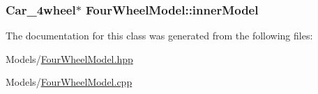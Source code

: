 \subsubsection[{\texorpdfstring{inner\+Model}{innerModel}}]{\setlength{\rightskip}{0pt plus 5cm}Car\+\_\+4wheel$\ast$ Four\+Wheel\+Model\+::inner\+Model\hspace{0.3cm}{\ttfamily [private]}}\hypertarget{classFourWheelModel_aa4e5165e690a959eda31d186f83e615d}{}\label{classFourWheelModel_aa4e5165e690a959eda31d186f83e615d}


The documentation for this class was generated from the following files\+:\begin{DoxyCompactItemize}
\item 
Models/\hyperlink{FourWheelModel_8hpp}{Four\+Wheel\+Model.\+hpp}\item 
Models/\hyperlink{FourWheelModel_8cpp}{Four\+Wheel\+Model.\+cpp}\end{DoxyCompactItemize}
